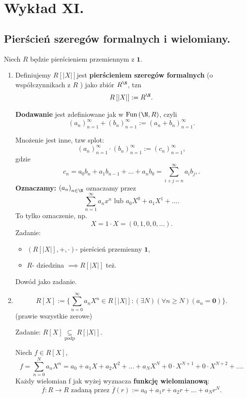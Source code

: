 \chapter{Wykład XI.}

\section{Pierścień szeregów formalnych i wielomiany.}
\begin{definition}
	Niech $R$ będzie pierścieniem przemiennym z $\mathbf{1}$. 
	
	\begin{enumerate}[label=\arabic*)]
		\item 
	Definiujemy $R\left[ \left| X \right|  \right] $jest \textbf{pierścieniem szeregów formalnych } (o współczynnikach z $R$ ) jako zbiór $R^{\N}$, tzn
	\[
	R\left[ \left| X \right|  \right] := R^{\N}
	.\] 

	\noindent \textbf{Dodawanie} jest zdefiniowane jak w $\text{Fun}\left( \N,R \right) $, czyli
	\[
		\left( a_{n} \right)_{n=1}^{\infty} +  \left( b_{n}  \right) _{n=1}^{\infty} := \left( a_{n} +b_{n}  \right) _{n=1}^{\infty}
	.\] 

	\noindent  Mnożenie jest inne, tzw splot:
	\[              
		\left( a_{n} \right)_{n=1}^{\infty} \cdot   \left( b_{n}  \right) _{n=1}^{\infty} := \left( c_{n}  \right) _{n=1}^{\infty}
	,\] 
	gdzie
	\[
		c_{n} = a_0b_{n} + a_1b_{n-1} + \ldots + a_{n}b_{0} = \sum_{i+j = n}^{\infty} a_{i}b_{j},
	.\] 
	\textbf{Oznaczamy:} $\left( a_{n} \right)_{n\in \N}$ oznaczamy przez
	\[
	\sum_{n = 1}^{\infty} a_{n}x^{n}\text{ lub } a_{0}X^{0} + a_{1}X^{1} + \ldots
	.\] 
	To tylko oznaczenie, np. 
	\[
	X = 1\cdot X = \left( 0,1,0,0,\ldots \right) 
	.\] 
	Zadanie:
	\begin{itemize}
		\item $\left( R\left[ \left| X \right|  \right] , +, \cdot  \right) $- pierścień przemienny $\mathbf{1}$,
		\item $R$- dziedzina $\implies R\left[ \left| X \right|  \right] $ też.
	\end{itemize}
	Dowód jako zadanie.
		\item 
			\[
			R\left[ X \right] := \{\sum_{n=0}^{\infty} a_{n} X^{n}\in R\left[ \left| X \right|  \right]: \left(\exists N \right)\left(\forall n \ge N \right) \left( a_{n} = \mathbf{0} \right)  \} 
			.\] 
			(prawie wszystkie zerowe)

			Zadanie: $R\left[ X \right] \underset{\scriptscriptstyle\text{podp}}{\subseteq} R\left[ \left| X \right|  \right].$
			
			Niech $f\in R\left[ X \right] $, 
			\[
			f = \sum_{n=0}^{N} a_{n} X^{n} = a_0 + a_1X + a_2X^2 + \ldots + a_{N}X^{N} + 0\cdot X^{N+1} + 0\cdot X^{N+2} + \ldots
			.\] 
			Każdy wielomian f jak wyżej wyznacza \textbf{funkcję wielomianową}:
			\[
			\overline{f}: R\to R \text{ zadaną przez } \overline{f}\left( r \right) := a_0 + a_1r + a_2r + \ldots + a_{N}r^{N}
			.\] 
	\end{enumerate}
\end{definition} 
